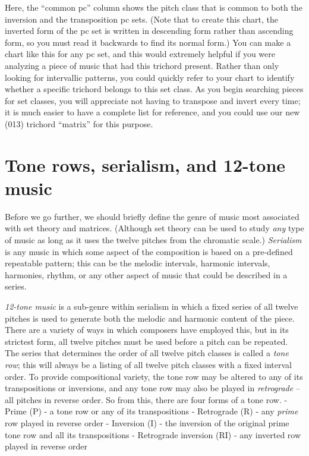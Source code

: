 \documentclass{book}
\begin{document}
Here, the ``common pc'' column shows the pitch class that is common to both
the inversion and the transposition pc sets. (Note that to create this chart,
the inverted form of the pc set is written in descending form rather than
ascending form, so you must read it backwards to find its normal form.) You
can make a chart like this for any pc set, and this would extremely helpful if
you were analyzing a piece of music that had this trichord present. Rather
than only looking for intervallic patterns, you could quickly refer to your
chart to identify whether a specific trichord belongs to this set class. As
you begin searching pieces for set classes, you will appreciate not having to
transpose and invert every time; it is much easier to have a complete list for
reference, and you could use our new (013) trichord ``matrix'' for this
purpose.

\hypertarget{tone-rows-serialism-and-12-tone-music}{%
\section{Tone rows, serialism, and 12-tone
music}\label{tone-rows-serialism-and-12-tone-music}}

Before we go further, we should briefly define the genre of music most
associated with set theory and matrices. (Although set theory can be used to
study \emph{any} type of music as long as it uses the twelve pitches from the
chromatic scale.) \emph{Serialism} is any music in which some aspect of the
composition is based on a pre-defined repeatable pattern; this can be the
melodic intervals, harmonic intervals, harmonies, rhythm, or any other aspect
of music that could be described in a series.

\emph{12-tone music} is a sub-genre within serialism in which a fixed series
of all twelve pitches is used to generate both the melodic and harmonic
content of the piece. There are a variety of ways in which composers have
employed this, but in its strictest form, all twelve pitches must be used
before a pitch can be repeated. The series that determines the order of all
twelve pitch classes is called a \emph{tone row}; this will always be a
listing of all twelve pitch classes with a fixed interval order. To provide
compositional variety, the tone row may be altered to any of its
transpositions or inversions, and any tone row may also be played in
\emph{retrograde} -- all pitches in reverse order. So from this, there are
four forms of a tone row. - Prime (P) - a tone row or any of its
transpositions - Retrograde (R) - any \emph{prime} row played in reverse order
- Inversion (I) - the inversion of the original prime tone row and all its
transpositions - Retrograde inversion (RI) - any inverted row played in
reverse order
\end{document}
